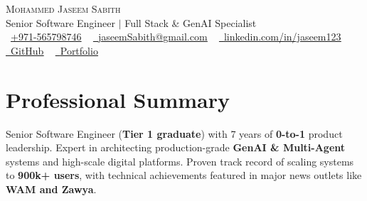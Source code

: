 \documentclass[letterpaper,12pt]{article}
\begin{document}
\begin{center}
    {\Huge \scshape Mohammed Jaseem Sabith} \\ \vspace{2pt}
    \large Senior Software Engineer $|$ Full Stack \& GenAI Specialist \\ \vspace{2pt}
    \small \raisebox{-0.1\height}\faPhone\ \href{tel:+971565798746}{+971-565798746} ~ \href{mailto:jaseemSabith@gmail.com}{\raisebox{-0.2\height}\faEnvelope\  \underline{jaseemSabith@gmail.com}} ~ 
    \href{https://www.linkedin.com/in/jaseem123/}{\raisebox{-0.2\height}\faLinkedin\ \underline{linkedin.com/in/jaseem123}} \\ \vspace{0pt}
    \href{https://github.com/Jaseem8}{\raisebox{-0.2\height}\faGithub\ \underline{GitHub}} ~
    \href{https://jaseem8.github.io/}{\raisebox{-0.2\height}\faGlobe\ \underline{Portfolio}}
    \vspace{-4pt}
\end{center}

\section{Professional Summary}
\vspace{-2pt}
\small{
    Senior Software Engineer (\textbf{Tier 1 graduate}) with 7 years of \textbf{0-to-1} product leadership. Expert in architecting production-grade \textbf{GenAI \& Multi-Agent} systems and high-scale digital platforms. Proven track record of scaling systems to \textbf{900k+ users}, with technical achievements featured in major news outlets like \textbf{WAM and Zawya}.
}
\vspace{-6pt}

\end{document}
